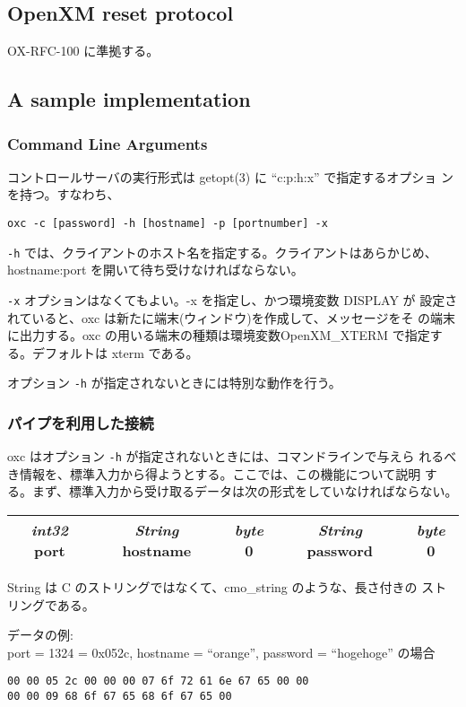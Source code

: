 \documentclass{article}
\begin{document}
\subsection{OpenXM reset protocol}
OX-RFC-100 に準拠する。

\subsection{A sample implementation}

\subsubsection{Command Line Arguments}
コントロールサーバの実行形式は getopt(3) に ``c:p:h:x'' で指定するオプショ
ンを持つ。すなわち、
\begin{verbatim}
oxc -c [password] -h [hostname] -p [portnumber] -x
\end{verbatim}

{\tt -h} では、クライアントのホスト名を指定する。クライアントはあらかじめ、
hostname:port を開いて待ち受けなければならない。

{\tt -x} オプションはなくてもよい。-x を指定し、かつ環境変数 DISPLAY が
設定されていると、oxc は新たに端末(ウィンドウ)を作成して、メッセージをそ
の端末に出力する。oxc の用いる端末の種類は環境変数OpenXM\_XTERM で指定す
る。デフォルトは xterm である。

オプション {\tt -h} が指定されないときには特別な動作を行う。

\subsubsection{パイプを利用した接続}

oxc はオプション {\tt -h} が指定されないときには、コマンドラインで与えら
れるべき情報を、標準入力から得ようとする。ここでは、この機能について説明
する。まず、標準入力から受け取るデータは次の形式をしていなければならない。
\begin{tabular}{|c|c|c|c|c|}
\hline
{\sl int32} port & {\sl String} hostname & {\sl byte} 0 & {\sl String} password & {\sl byte} 0\\
\hline
\end{tabular}

\medskip

String は C のストリングではなくて、cmo\_string のような、長さ付きの
ストリングである。

\noindent
データの例: \\
port = 1324 = 0x052c, hostname = ``orange'', password = ``hogehoge''
の場合
\begin{verbatim}
00 00 05 2c 00 00 00 07 6f 72 61 6e 67 65 00 00
00 00 09 68 6f 67 65 68 6f 67 65 00
\end{verbatim}
\end{document}
